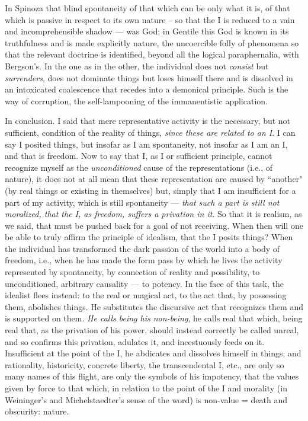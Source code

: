 In Spinoza that blind spontaneity of that which can be only what it is, of that which is passive in respect to its own nature – so that the I is reduced to a vain and incomprehensible shadow — was God; in Gentile this God is known in its truthfulness and is made explicitly nature, the uncoercible folly of phenomena so that the relevant doctrine is identified, beyond all the logical paraphernalia, with Bergson's. In the one as in the other, the individual does not \emph{consist} but \emph{surrenders}, does not dominate things but loses himself there and is dissolved in an intoxicated coalescence that recedes into a demonical principle. Such is the way of corruption, the self-lampooning of the immanentistic application.

In conclusion. I said that mere representative activity is the necessary, but not sufficient, condition of the reality of things, \emph{since these are related to an I}. I can say I posited things, but insofar as I am spontaneity, not insofar as I am an I, and that is freedom. Now to say that I, as I or sufficient principle, cannot recognize myself as the \emph{unconditioned} cause of the representations (i.e., of nature), it does not at all mean that these representation are caused by ``another" (by real things or existing in themselves) but, simply that I am insufficient for a part of my activity, which is still spontaneity — \emph{that such a part is still not moralized, that the I, as freedom, suffers a privation in it}. So that it is realism, as we said, that must be pushed back for a goal of not receiving. When then will one be able to truly affirm the principle of idealism, that the I posits things? When the individual has transformed the dark passion of the world into a body of freedom, i.e., when he has made the form pass by which he lives the activity represented by spontaneity, by connection of reality and possibility, to unconditioned, arbitrary causality — to potency. In the face of this task, the idealist flees instead: to the real or magical act, to the act that, by possessing them, abolishes things. He substitutes the discursive act that recognizes them and is supported on them. \emph{He calls being his non-being}, he calls real that which, being real that, as the privation of his power, should instead correctly be called unreal, and so confirms this privation, adulates it, and incestuously feeds on it. Insufficient at the point of the I, he abdicates and dissolves himself in things; and rationality, historicity, concrete liberty, the transcendental I, etc., are only so many names of this flight, are only the symbols of his impotency, that the values given by force to that which, in relation to the point of the I and morality (in Weininger's and Michelstaedter's sense of the word) is non-value = death and obscurity: nature.



